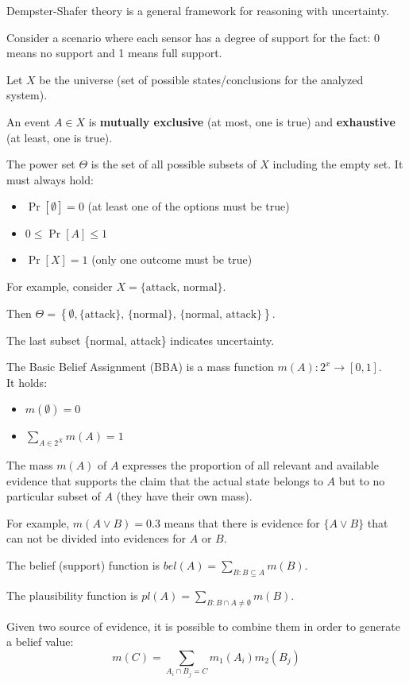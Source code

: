 \documentclass[a4paper, 12pt]{article}
\begin{document}
Dempster-Shafer theory is a general framework for reasoning with uncertainty.

Consider a scenario where each sensor has a degree of support for the fact: 0 means no support and 1 means full support.

Let $X$ be the universe (set of possible states/conclusions for the analyzed system).

An event $A \in X$ is \textbf{mutually exclusive} (at most, one is true) and \textbf{exhaustive} (at least, one is true).

The power set $\Theta$ is the set of all possible subsets of $X$ including the empty set. It must always hold:
\begin{itemize}
    \item $\Pr[\emptyset] = 0$ (at least one of the options must be true)
    \item $0 \leq \Pr[A] \leq 1$
    \item $\Pr[X] = 1$ (only one outcome must be true)
\end{itemize}

For example, consider $ X = \{ \text{attack, normal} \}$.

Then $ \Theta = \left\{ \emptyset, \text{\{attack\}, \{normal\}, \{normal, attack\}}\right\} $.

The last subset \{normal, attack\} indicates uncertainty.

The Basic Belief Assignment (BBA) is a mass function $ m(A): 2^x \rightarrow [0,1] $.\\
It holds:
\begin{itemize}
    \item $m(\emptyset) = 0 $
    \item $\sum\limits_{A \in 2^X} m(A) = 1$
\end{itemize}The mass $m(A)$ of $A$ expresses the proportion of all relevant and available evidence that supports the claim that the actual state belongs to $A$ but to no particular subset of $A$ (they have their own mass).

For example, $m(A \lor B) = 0.3 $ means that there is evidence for $\{A \lor B\}$ that can not be divided into evidences for $A$ or $B$.

The belief (support) function is $bel(A) = \sum\limits_{B:B \subseteq A} m(B) $.

The plausibility function is $pl(A) = \sum\limits_{B:B \cap A \neq \emptyset} m(B) $.

Given two source of evidence, it is possible to combine them in order to generate a belief value:
\begin{equation}
	m(C) = \sum\limits_{A_i \cap B_j = C} m_1(A_i) m_2(B_j)
\end{equation}
\end{document}
